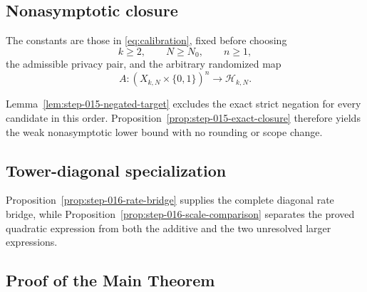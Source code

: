 \subsection{Nonasymptotic closure}\label{app:step-015}
The constants are those in \eqref{eq:calibration}, fixed before choosing
\begin{equation}
k\ge2,
\qquad N\ge N_0,
\qquad n\ge1,
\tag{T2}\label{eq:candidate-order}
\end{equation}
the admissible privacy pair, and the arbitrary randomized map
\begin{equation}
A:(X_{k,N}\times\{0,1\})^n\longrightarrow\mathcal H_{k,N}.
\tag{T4}\label{eq:candidate-map}
\end{equation}

Lemma~\ref{lem:step-015-negated-target} excludes the exact strict negation
for every candidate in this order.  Proposition~\ref{prop:step-015-exact-closure}
therefore yields the weak nonasymptotic lower bound with no rounding or
scope change.

\subsection{Tower-diagonal specialization}\label{app:step-016}

Proposition~\ref{prop:step-016-rate-bridge} supplies the complete diagonal
rate bridge, while Proposition~\ref{prop:step-016-scale-comparison}
separates the proved quadratic expression from both the additive and the
two unresolved larger expressions.

\subsection{Proof of the Main Theorem}\label{app:main-proof}

